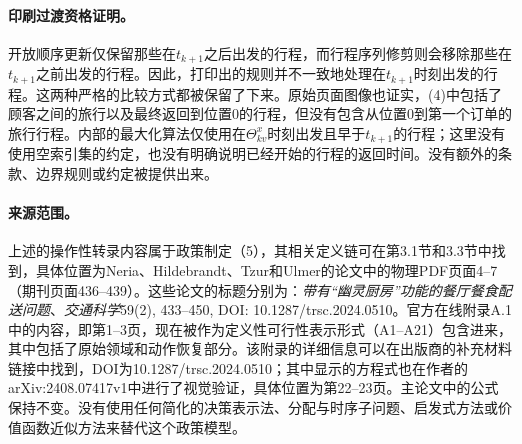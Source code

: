 \documentclass{article}
\begin{document}
\paragraph{印刷过渡资格证明。}
开放顺序更新仅保留那些在\(t_{k+1}\)之后出发的行程，而行程序列修剪则会移除那些在\(t_{k+1}\)之前出发的行程。因此，打印出的规则并不一致地处理在\(t_{k+1}\)时刻出发的行程。这两种严格的比较方式都被保留了下来。原始页面图像也证实，(4)中包括了顾客之间的旅行以及最终返回到位置\(0\)的行程，但没有包含从位置\(0\)到第一个订单的旅行行程。内部的最大化算法仅使用在\(\Theta^x_{kv}\)时刻出发且早于\(t_{k+1}\)的行程；这里没有使用空索引集的约定，也没有明确说明已经开始的行程的返回时间。没有额外的条款、边界规则或约定被提供出来。

\paragraph{来源范围。}
上述的操作性转录内容属于政策制定（5），其相关定义链可在第3.1节和3.3节中找到，具体位置为Neria、Hildebrandt、Tzur和Ulmer的论文中的物理PDF页面4–7（期刊页面436–439）。这些论文的标题分别为：\emph{带有“幽灵厨房”功能的餐厅餐食配送问题}、\emph{交通科学}59(2), 433–450, DOI: 10.1287/trsc.2024.0510。官方在线附录A.1中的内容，即第1–3页，现在被作为定义性可行性表示形式（A1–A21）包含进来，其中包括了原始领域和动作恢复部分。该附录的详细信息可以在出版商的补充材料链接中找到，DOI为10.1287/trsc.2024.0510；其中显示的方程式也在作者的arXiv:2408.07417v1中进行了视觉验证，具体位置为第22–23页。主论文中的公式保持不变。没有使用任何简化的决策表示法、分配与时序子问题、启发式方法或价值函数近似方法来替代这个政策模型。
\end{document}

